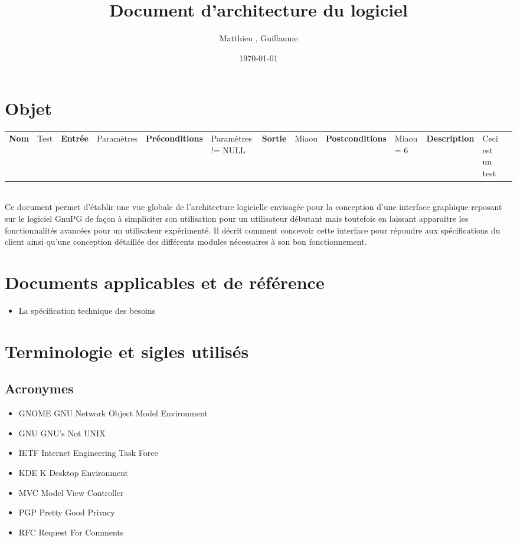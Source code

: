 \documentclass{../res/univ-projet}
\title{Document d'architecture du logiciel}
\author{Matthieu \bsc{Fin}, Guillaume \bsc{Leroy}}
\date{\today}
\newcommand{\methode}[6]{
  \begin{tabular}{|>{\centering}p{1cm}|>{\centering}p{7cm}|}
    \hline
    \color{white}\cellcolor{blue}\bfseries{Nom}&
    #1&
    \hline
    \color{white}\cellcolor{blue}\bfseries{Entrée}&
    #2&
    \hline
    \color{white}\cellcolor{blue}\bfseries{Préconditions}&
    #3&
    \hline
    \color{white}\cellcolor{blue}\bfseries{Sortie}&
    #4&
    \hline
    \color{white}\cellcolor{blue}\bfseries{Postconditions}&
    #5&
    \hline
    \color{white}\cellcolor{blue}\bfseries{Description}&
    #6&
    \hline
  \end{tabular}\\
}
\begin{document}
\maketitle
\newpage
\tableofcontents
\newpage

\section{Objet}
  \methode{Test}{Paramètres}{Paramètres != NULL}{Miaou}{Miaou = 6}{Ceci est un test}
  Ce document permet d'établir une vue globale de l'architecture logicielle envisagée pour la conception d'une interface graphique reposant sur le logiciel GnuPG de façon à simpliciter son utilisation pour un utilisateur débutant mais toutefois en laissant apparaitre les fonctionnalités avancées pour un utilisateur expérimenté. Il décrit comment concevoir cette interface pour répondre aux spécifications du client ainsi qu'une conception détaillée des différents modules nécessaires à son bon fonctionnement. 

\section{Documents applicables et de référence}
  \begin{itemize}
    \item La spécification technique des besoins
  \end{itemize}

\section{Terminologie et sigles utilisés}
  \subsection{Acronymes}
    \begin{itemize}
      \item GNOME GNU Network Object Model Environment
      \item GNU GNU's Not UNIX
      \item IETF Internet Engineering Task Force
      \item KDE K Desktop Environment
      \item MVC Model View Controller
      \item PGP Pretty Good Privacy
      \item RFC Request For Comments
    \end{itemize}
\end{document}
